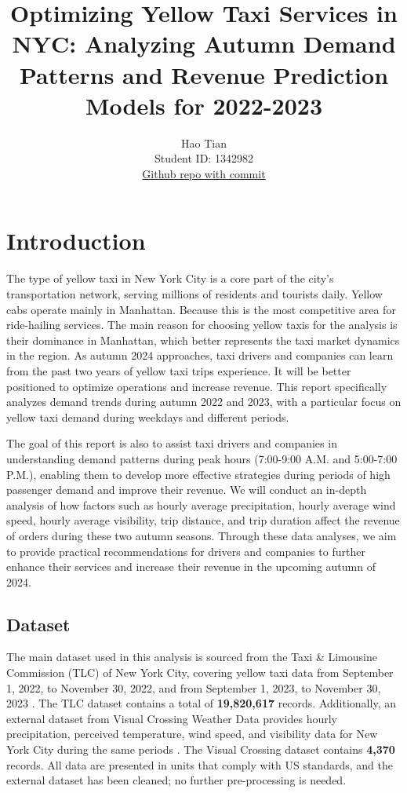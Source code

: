 \documentclass[11pt]{article}
\title{\textbf{Optimizing Yellow Taxi Services in NYC: Analyzing Autumn Demand Patterns and Revenue Prediction Models for 2022-2023}}
\author{
Hao Tian \\
Student ID: 1342982 \\
\href{https://github.com/MAST30034-AppliedDataScience/project-1-individual-Mark860787}{Github repo with commit}
}
\begin{document}
\maketitle

\section{Introduction}

The type of yellow taxi in New York City is a core part of the city’s transportation network, serving millions of residents and tourists daily. Yellow cabs operate mainly in Manhattan. Because this is the most competitive area for ride-hailing services. The main reason for choosing yellow taxis for the analysis is their dominance in Manhattan, which better represents the taxi market dynamics in the region. As autumn 2024 approaches, taxi drivers and companies can learn from the past two years of yellow taxi trips experience. It will be better positioned to optimize operations and increase revenue. This report specifically analyzes demand trends during autumn 2022 and 2023, with a particular focus on yellow taxi demand during weekdays and different periods.

The goal of this report is also to assist taxi drivers and companies in understanding demand patterns during peak hours (7:00-9:00 A.M. and 5:00-7:00 P.M.), enabling them to develop more effective strategies during periods of high passenger demand and improve their revenue. We will conduct an in-depth analysis of how factors such as hourly average precipitation, hourly average wind speed, hourly average visibility, trip distance, and trip duration affect the revenue of orders during these two autumn seasons. Through these data analyses, we aim to provide practical recommendations for drivers and companies to further enhance their services and increase their revenue in the upcoming autumn of 2024.
 


\subsection{Dataset}
The main dataset used in this analysis is sourced from the Taxi \& Limousine Commission (TLC) of New York City, covering yellow taxi data from September 1, 2022, to November 30, 2022, and from September 1, 2023, to November 30, 2023 \cite{TLC2023}. The TLC dataset contains a total of \textbf{19,820,617} records. Additionally, an external dataset from Visual Crossing Weather Data provides hourly precipitation, perceived temperature, wind speed, and visibility data for New York City during the same periods \cite{VisualCrossing2023}. The Visual Crossing dataset contains \textbf{4,370} records. All data are presented in units that comply with US standards, and the external dataset has been cleaned; no further pre-processing is needed.
\end{document}
